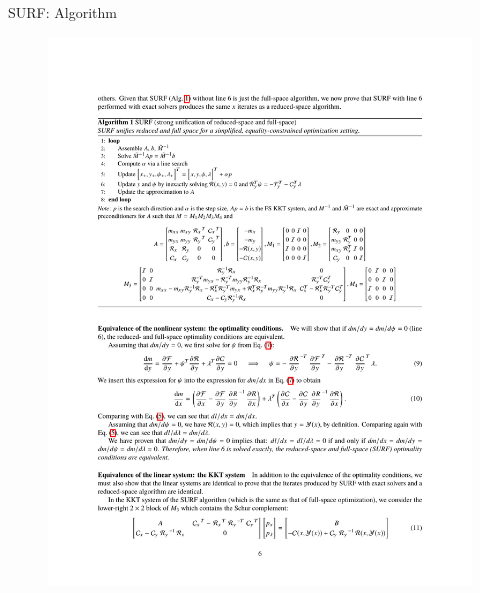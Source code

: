 \documentclass{beamer}
\begin{document}
  \begin{frame}{SURF: Algorithm}
    \begin{figure}[ht]
      \centering
      \vspace{0mm}
      \includegraphics[width=\linewidth]{Figures/algorithm}
 
      \label{fig:model_evals}
    \end{figure}
  \end{frame}
\end{document}
